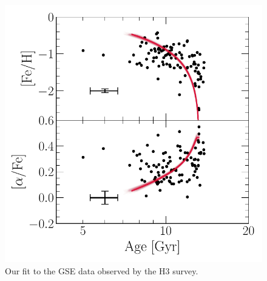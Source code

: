 \documentclass[ms.tex]{subfiles}
\begin{document}
\begin{figure}
\includegraphics[scale = 0.42]{gsefit_amr.pdf}
\caption{Our fit to the GSE data observed by the H3 survey.}
\label{fig:gse_bestfit}
\end{figure}
\end{document}
